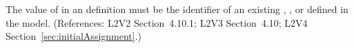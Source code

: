 The value of  in an \InitialAssignment definition must be the
identifier of an existing \Compartment, \Species, or \Parameter defined in
the model.  (References: L2V2 Section~4.10.1; L2V3
Section~4.10; L2V4 Section~\ref{sec:initialAssignment}.)
